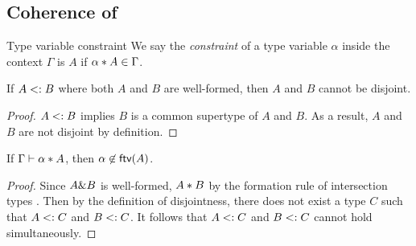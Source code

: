 \subsection{Coherence of \name}

\begin{definition}{Type variable constraint}
  We say the \emph{constraint} of a type variable $\alpha$ inside the context
  $\Gamma$ is $A$ if $\alpha * A \in \Gamma$.
\end{definition}

\begin{lemma}
If $A <: B$ where both $A$ and $B$ are well-formed, then $A$ and $B$ cannot be disjoint.
\end{lemma}

\begin{proof}
$A <: B$ implies $B$ is a common supertype of $A$ and $B$. As a result, $A$ and $B$ are not disjoint by definition.
\end{proof}

\begin{lemma} \label{lemma:free-var-disjoint-bounds}
  If $\Gamma \vdash \alpha * A$, then $\alpha \not \in \textsf{ftv}(A)$.
\end{lemma}

\begin{proof}
Since $A \& B$ is well-formed, $A * B$ by the formation rule of intersection types . Then by the definition of disjointness, there does not exist a type $C$ such that $A <: C$ and $B <: C$. It follows that $A <: C$ and $B <: C$ cannot hold simultaneously.
\end{proof}

